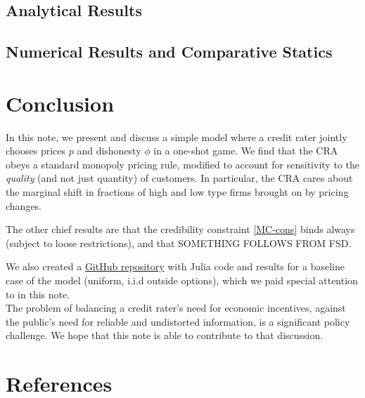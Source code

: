 \documentclass{article}
\theoremstyle{definition}
\begin{document}
\subsection{Analytical Results}

\subsection{Numerical Results and Comparative Statics}

\newpage

\section{Conclusion}

In this note, we present and discuss a simple model where a credit rater jointly chooses prices $p$ and dishonesty $\phi$ in a one-shot game. We find that the CRA obeys a standard monopoly pricing rule, modified to account for sensitivity to the \emph{quality} (and not just quantity) of customers. In particular, the CRA cares about the marginal shift in fractions of high and low type firms brought on by pricing changes.

The other chief results are that the credibility constraint \eqref{MC-cons} binds always (subject to loose restrictions), and that {SOMETHING FOLLOWS FROM FSD.}

We also created a \href{https://github.com/arnavs/credit}{\color{blue} GitHub repository} with Julia code and results for a baseline case of the model (uniform, i.i.d outside options), which we paid special attention to in this note. \\ 

The problem of balancing a credit rater's need for economic incentives, against the public's need for reliable and undistorted information, is a significant policy challenge. We hope that this note is able to contribute to that discussion.

\newpage

\section{References}


\end{document}
